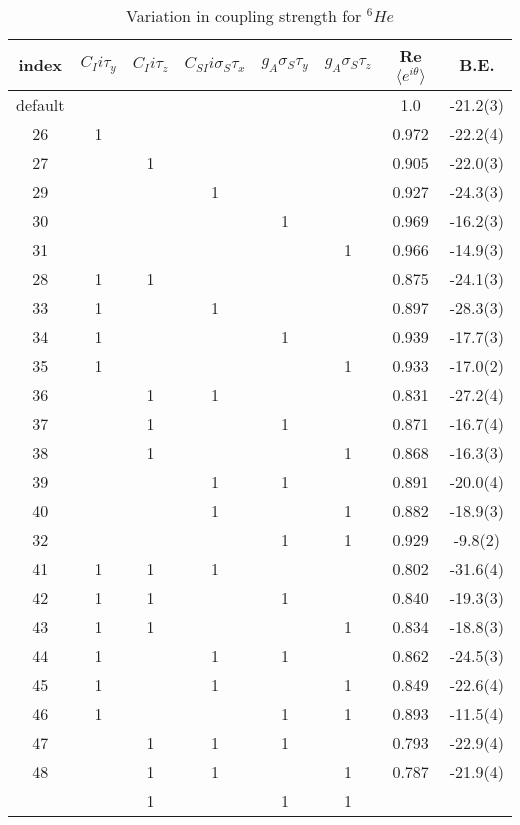\documentclass[10pt]{book}
\def\la{\langle}
\def\ra{\rangle}
\begin{document}
\begin{table}
\caption{Variation in coupling strength for $^6He$}
\begin{center}
\begin{tabular}{c|ccccc|cc}
index & $C_{I} i\tau_y$ & $C_I i\tau_z$ 
      &$C_{SI} i\sigma_S\tau_x$ 
      & $g_A\sigma_S\tau_y$ & $g_A\sigma_S\tau_z$ 
      & Re$\la e^{i\theta}\ra$ & B.E. \\ \hline
default &   &  &  &  &  & 1.0 & -21.2(3)\\ 
26    & 1 &  &   &   &   & 0.972 & -22.2(4) \\
27    &   & 1&   &   &   & 0.905 & -22.0(3) \\
29    &   &  & 1 &   &   & 0.927 & -24.3(3) \\
30    &   &  &   & 1 &   & 0.969 & -16.2(3) \\ 
31    &   &  &   &   & 1 & 0.966 & -14.9(3) \\
28    & 1 & 1&   &   &   & 0.875 & -24.1(3) \\
33    & 1 &  & 1 &   &   & 0.897 & -28.3(3) \\
34    & 1 &  &   & 1 &   & 0.939 & -17.7(3) \\
35    & 1 &  &   &   & 1 & 0.933 & -17.0(2) \\
36    &   & 1& 1 &   &   & 0.831 & -27.2(4) \\
37    &   & 1&   & 1 &   & 0.871 & -16.7(4) \\
38    &   & 1&   &   & 1 & 0.868 & -16.3(3) \\
39    &   &  & 1 & 1 &   & 0.891 & -20.0(4) \\
40    &   &  & 1 &   & 1 & 0.882 & -18.9(3) \\
32    &   &  &   &  1& 1 & 0.929 & -9.8(2) \\
41    & 1 & 1& 1 &   &   & 0.802 & -31.6(4) \\
42    & 1 & 1&   & 1 &   & 0.840 & -19.3(3) \\
43    & 1 & 1&   &   & 1 & 0.834 & -18.8(3) \\
44    & 1 &  & 1 & 1 &   & 0.862 & -24.5(3) \\
45    & 1 &  & 1 &   & 1 & 0.849 & -22.6(4) \\
46    & 1 &  &   & 1 & 1 & 0.893 & -11.5(4) \\
47    &   & 1& 1 & 1 &   & 0.793 & -22.9(4) \\
48    &   & 1& 1 &   & 1 & 0.787 & -21.9(4) \\
      &   & 1&   & 1 & 1 &       &          \\

\end{tabular}
\end{center}
\end{table}
\end{document}
